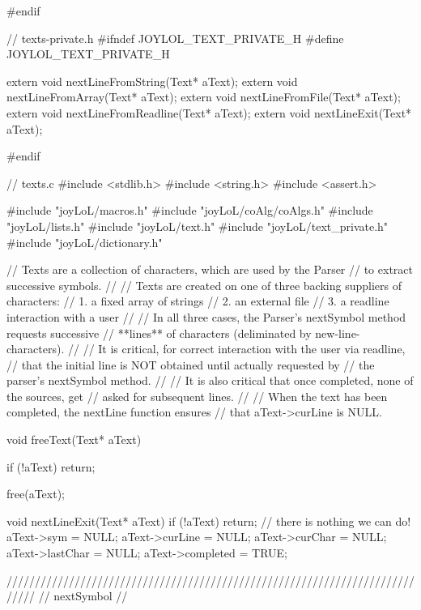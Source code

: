 #endif
\stoptyping

\starttyping
// texts-private.h
#ifndef JOYLOL_TEXT_PRIVATE_H
#define JOYLOL_TEXT_PRIVATE_H

extern void nextLineFromString(Text* aText);
extern void nextLineFromArray(Text* aText);
extern void nextLineFromFile(Text* aText);
extern void nextLineFromReadline(Text* aText);
extern void nextLineExit(Text* aText);

#endif
\stoptyping

\starttyping
// texts.c
#include <stdlib.h>
#include <string.h>
#include <assert.h>

#include "joyLoL/macros.h"
#include "joyLoL/coAlg/coAlgs.h"
#include "joyLoL/lists.h"
#include "joyLoL/text.h"
#include "joyLoL/text_private.h"
#include "joyLoL/dictionary.h"

// Texts are a collection of characters, which are used by the Parser
// to extract successive symbols.
//
// Texts are created on one of three backing suppliers of characters:
// 1. a fixed array of strings
// 2. an external file
// 3. a readline interaction with a user
//
// In all three cases, the Parser's nextSymbol method requests successive
// **lines** of characters (deliminated by new-line-characters).
//
// It is critical, for correct interaction with the user via readline,
// that the initial line is NOT obtained until actually requested by
// the parser's nextSymbol method.
//
// It is also critical that once completed, none of the sources, get
// asked for subsequent lines.
//
// When the text has been completed, the nextLine function ensures
// that aText->curLine is NULL.

void freeText(Text* aText) {
  if (!aText) return;

  free(aText);
}

void nextLineExit(Text* aText) {
  if (!aText) return; // there is nothing we can do!
  aText->sym       = NULL;
  aText->curLine   = NULL;
  aText->curChar   = NULL;
  aText->lastChar  = NULL;
  aText->completed = TRUE;
}

/////////////////////////////////////////////////////////////////////////////
// nextSymbol
//

